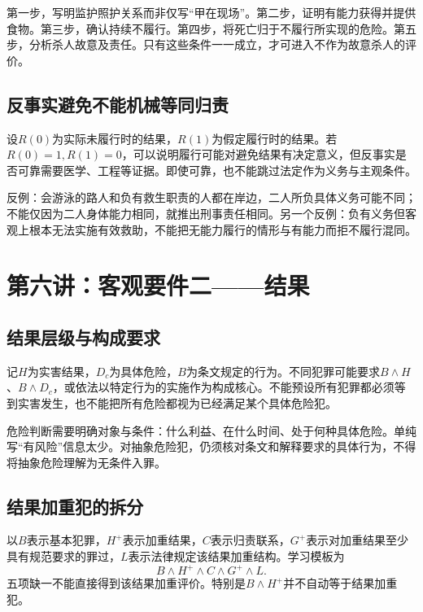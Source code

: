第一步，写明监护照护关系而非仅写“甲在现场”。第二步，证明有能力获得并提供食物。第三步，确认持续不履行。第四步，将死亡归于不履行所实现的危险。第五步，分析杀人故意及责任。只有这些条件一一成立，才可进入不作为故意杀人的评价。

\subsection{反事实避免不能机械等同归责}
设$R(0)$为实际未履行时的结果，$R(1)$为假定履行时的结果。若$R(0)=1,R(1)=0$，可以说明履行可能对避免结果有决定意义，但反事实是否可靠需要医学、工程等证据。即使可靠，也不能跳过法定作为义务与主观条件。

反例：会游泳的路人和负有救生职责的人都在岸边，二人所负具体义务可能不同；不能仅因为二人身体能力相同，就推出刑事责任相同。另一个反例：负有义务但客观上根本无法实施有效救助，不能把无能力履行的情形与有能力而拒不履行混同。


\section{第六讲：客观要件二——结果}
\subsection{结果层级与构成要求}
记$H$为实害结果，$D_c$为具体危险，$B$为条文规定的行为。不同犯罪可能要求$B\wedge H$、$B\wedge D_c$，或依法以特定行为的实施作为构成核心。不能预设所有犯罪都必须等到实害发生，也不能把所有危险都视为已经满足某个具体危险犯。

危险判断需要明确对象与条件：什么利益、在什么时间、处于何种具体危险。单纯写“有风险”信息太少。对抽象危险犯，仍须核对条文和解释要求的具体行为，不得将抽象危险理解为无条件入罪。

\subsection{结果加重犯的拆分}
以$B$表示基本犯罪，$H^+$表示加重结果，$C$表示归责联系，$G^+$表示对加重结果至少具有规范要求的罪过，$L$表示法律规定该结果加重结构。学习模板为
\[
 B\wedge H^+\wedge C\wedge G^+\wedge L.
\]
五项缺一不能直接得到该结果加重评价。特别是$B\wedge H^+$并不自动等于结果加重犯。

